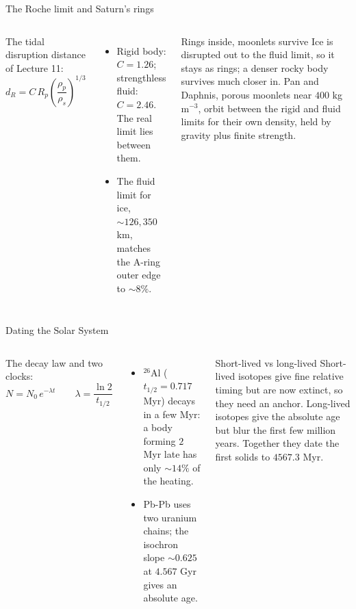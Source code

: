 \documentclass[aspectratio=169, 11pt]{beamer}
\begin{document}
\begin{frame}{The Roche limit and Saturn's rings}
  \small
  \begin{columns}[T]
    The tidal disruption distance of Lecture 11:
    \[
      \boxed{d_R = C\,R_p\left(\frac{\rho_p}{\rho_s}\right)^{1/3}}
    \]
    \begin{itemize}
      \item Rigid body: $C = 1.26$; strengthless fluid: $C = 2.46$. The real limit lies between them.
      \item The fluid limit for ice, $\sim 126{,}350$ km, matches the A-ring outer edge to $\sim 8\%$.
    \end{itemize}

    \begin{block}{Rings inside, moonlets survive}
      Ice is disrupted out to the fluid limit, so it stays as rings; a denser rocky body survives much closer in. Pan and Daphnis, porous moonlets near $400$ kg m$^{-3}$, orbit between the rigid and fluid limits for their own density, held by gravity plus finite strength.
    \end{block}
  \end{columns}
\end{frame}

\begin{frame}{Dating the Solar System}
  \small
  \begin{columns}[T]
    The decay law and two clocks:
    \[
      \boxed{N = N_0\,e^{-\lambda t}} \qquad \lambda = \frac{\ln 2}{t_{1/2}}
    \]
    \begin{itemize}
      \item $^{26}$Al ($t_{1/2} = 0.717$ Myr) decays in a few Myr: a body forming $2$ Myr late has only $\sim 14\%$ of the heating.
      \item Pb-Pb uses two uranium chains; the isochron slope $\sim 0.625$ at $4.567$ Gyr gives an absolute age.
    \end{itemize}

    \begin{block}{Short-lived vs long-lived}
      Short-lived isotopes give fine relative timing but are now extinct, so they need an anchor. Long-lived isotopes give the absolute age but blur the first few million years. Together they date the first solids to $4567.3$ Myr.
    \end{block}
  \end{columns}
\end{frame}
\end{document}
